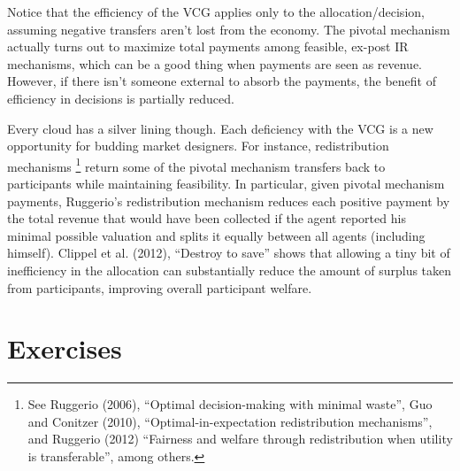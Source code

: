 \documentclass[10pt]{article}
\begin{document}
\begin{spacing}{1.0}
\hspace{1em}
Notice that the efficiency of the VCG applies only to the
allocation/decision, assuming negative transfers aren't lost from the
economy. The pivotal mechanism actually turns out to maximize total
payments among feasible, ex-post IR mechanisms, which can be a good thing when
payments are seen as revenue. However, if there isn't someone external to
absorb the payments, the benefit of efficiency in decisions is partially
reduced. 

\hspace{1em}
Every cloud has a silver lining though. Each deficiency with the VCG is a
new opportunity for budding market designers. For instance, redistribution
mechanisms \footnote{See Ruggerio (2006), ``Optimal decision-making with
  minimal waste'', Guo and Conitzer (2010), ``Optimal-in-expectation
  redistribution mechanisms'', and Ruggerio (2012) ``Fairness and welfare
  through redistribution when utility is transferable'', among others.}
return some of the pivotal mechanism transfers back to participants while
maintaining feasibility. In particular, given pivotal mechanism payments,
Ruggerio's redistribution mechanism reduces each positive payment by the
total revenue that would have been collected if the agent reported his
minimal possible valuation and splits it equally between all agents
(including himself).  Clippel et al. (2012), ``Destroy to save'' shows that
allowing a tiny bit of inefficiency in the allocation can substantially
reduce the amount of surplus taken from participants, improving overall
participant welfare.

\newpage
\section{Exercises}
\label{sec:exercises}


\end{spacing}
\end{document}
